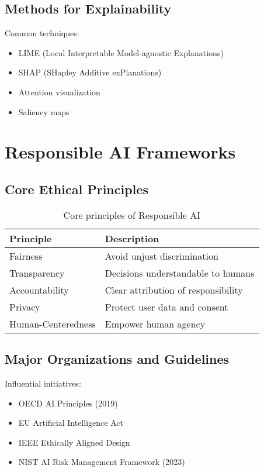 \documentclass[openany]{book}
\begin{document}
\subsection{Methods for Explainability}
Common techniques:

\begin{itemize}
    \item LIME (Local Interpretable Model-agnostic Explanations)
    \item SHAP (SHapley Additive exPlanations)
    \item Attention visualization
    \item Saliency maps
\end{itemize}

\section{Responsible AI Frameworks}

\subsection{Core Ethical Principles}
\begin{table}[h]
\centering
\begin{tabular}{|l|l|}
\hline
\textbf{Principle} & \textbf{Description} \\ \hline
Fairness & Avoid unjust discrimination \\ \hline
Transparency & Decisions understandable to humans \\ \hline
Accountability & Clear attribution of responsibility \\ \hline
Privacy & Protect user data and consent \\ \hline
Human-Centeredness & Empower human agency \\ \hline
\end{tabular}
\caption{Core principles of Responsible AI}
\end{table}

\subsection{Major Organizations and Guidelines}
Influential initiatives:

\begin{itemize}
    \item OECD AI Principles (2019)
    \item EU Artificial Intelligence Act
    \item IEEE Ethically Aligned Design
    \item NIST AI Risk Management Framework (2023)
\end{itemize}
\end{document}
